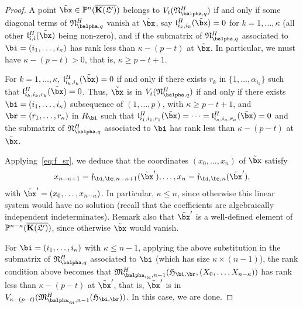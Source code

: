 \documentclass[12pt]{article}
\begin{document}
\begin{proof}
  A point $\tilde\bx \in \P^n(\KKGpbar)$ belongs to
  $V_t(\mathfrak{N}^H_{\balpha,q})$ if and only if some diagonal terms
  of $\mathfrak{N}^H_{\balpha,q}$ vanish at $\tilde\bx$, say
  $\mathfrak{l}^H_{i_k,i_k}(\tilde\bx)=0$ for $k=1,\dots,\kappa$ (all
  other $\mathfrak{l}^H_{i,i}(\tilde\bx)$ being non-zero), and
  if the submatrix of $\mathfrak{N}^H_{\balpha,q}$ associated to
  $\bi=(i_1,\dots,i_\kappa)$ has rank less than $\kappa-(p-t)$ at $\tilde
  \bx$.  In particular, we must have
  $\kappa-(p-t) > 0$, that is, $\kappa \ge p-t+1$.

  For $k=1,\dots,\kappa$, $\mathfrak{l}^H_{i_k,i_k}(\tilde\bx)=0$ if
  and only if there exists $r_k$ in $\{1,\dots,\alpha_{i_k}\}$ such
  that $\mathfrak{l}^H_{i_k,i_k,r_k}(\tilde\bx)=0$. Thus, $\tilde\bx$
  is in $V_t(\mathfrak{N}^H_{\balpha,q})$ if and only if there exists
  $\bi=(i_1,\dots,i_\kappa)$ subsequence of $(1,\dots,p)$, with
  $\kappa \ge p-t+1$, and $\br=(r_1,\dots,r_\kappa)$ in $R_\bi$ such that
  $\mathfrak{l}^H_{i_1,i_1,r_1}(\tilde\bx)=\cdots=\mathfrak{l}^H_{i_\kappa,i_\kappa,r_\kappa}(\tilde\bx)=0$
  and the submatrix of $\mathfrak{N}^H_{\balpha,q}$ associated to $\bi$
  has rank less than $\kappa-(p-t)$ at $\tilde\bx$.  

  Applying~\eqref{eq:f_sr}, we deduce that the coordinates $(x_0,\dots,x_n)$ 
  of $\tilde \bx$ satisfy
  \begin{align*}
    x_{n-\kappa+1}=\mathfrak{f}_{\bi,\br,n-\kappa+1}(\tilde\bx'),\dots,x_{n}=\mathfrak{f}_{\bi,\br,n}(\tilde\bx'),
  \end{align*}
  with $\tilde\bx'=(x_0,\dots,x_{n-\kappa})$.  In particular, $\kappa
  \le n$, since otherwise this linear system would have no solution
  (recall that the coefficients are algebraically independent
  indeterminates). Remark also that $\tilde\bx'$ is a well-defined
  element of $\mathbb{P}^{n-\kappa}(\overline{\mathbf{K}(\mathfrak{L}')})$, since otherwise $\tilde\bx$ would
  vanish.

  For $\bi=(i_1,\dots,i_\kappa)$ with $\kappa \le n-1$, applying the above
  substitution in the submatrix of $\mathfrak{N}^H_{\balpha,q}$
  associated to $\bi$ (which has size $\kappa \times (n-1)$), the rank
  condition above becomes that
  $\mathfrak{M}^H_{\balpha_\bi,n-1}(\mathfrak{H}_{\bi,\br},(X_0,\dots,X_{n-\kappa}))$
  has rank less than $\kappa-(p-t)$ at $\tilde \bx'$, that is, $\tilde
  \bx'$ is in
  $V_{\kappa-(p-t)}(\mathfrak{M}^H_{\balpha_\bi,n-1}(\mathfrak{H}_{\bi,\br}))$.
  In this case, we are done.


\end{proof}
\end{document}
